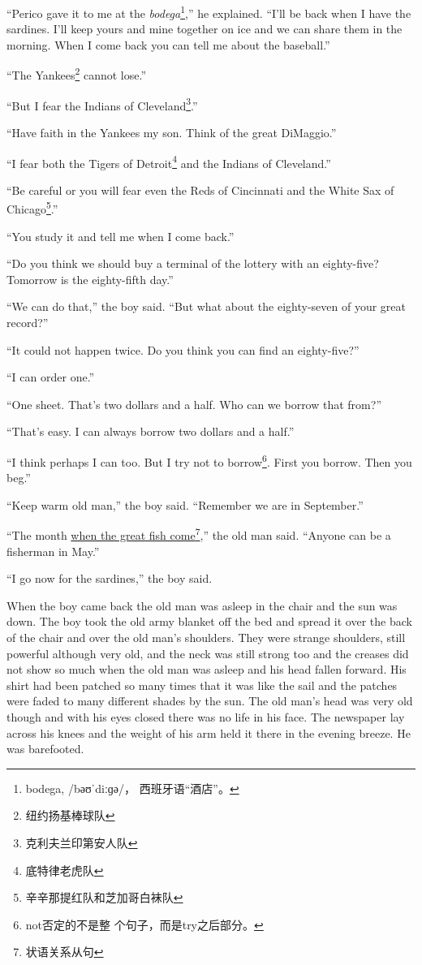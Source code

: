 \documentclass[fontset=ubuntu]{ctexrep}
\newcommand\doulos[1]{{\fontspec{Doulos SIL} /#1/}}
\begin{document}
``Perico gave it to me at the \emph{bodega}\footnote{bodega, \doulos{bәʊˈdiːɡә}，
  西班牙语“酒店”。},'' he explained. ``I'll be back when I have the
sardines. I'll keep yours and mine together on ice and we can share them in
the morning. When I come back you can tell me about the baseball.''

``The Yankees\footnote{纽约扬基棒球队} cannot lose.''

``But I fear the Indians of Cleveland\footnote{克利夫兰印第安人队}.''

``Have faith in the Yankees my son. Think of the great DiMaggio.''

``I fear both the Tigers of Detroit\footnote{底特律老虎队} and the Indians of Cleveland.''

``Be careful or you will fear even the Reds of Cincinnati and the White Sax of Chicago\footnote{辛辛那提红队和芝加哥白袜队}.''

``You study it and tell me when I come back.''

``Do you think we should buy a \gls{terminal} of the lottery with an eighty-five?
Tomorrow is the eighty-fifth day.''

``We can do that,'' the boy said. ``But what about the eighty-seven of your great record?''

``It could not happen twice. Do you think you can find an eighty-five?''

``I can \gls{order} one.''

``One sheet. That's two dollars and a half. Who can we borrow that from?''

``That's easy. I can always borrow two dollars and a half.''

``I think perhaps I can too. But I try not to borrow\footnote{not否定的不是整
  个句子，而是try之后部分。}. First you borrow. Then you beg.''

``Keep warm old man,'' the boy said. ``Remember we are in September.''

``The month \uline{when the great fish come}\footnote{状语关系从句},'' the old
man said. ``Anyone can be a fisherman in May.''

``I go now for the sardines,'' the boy said.

When the boy came back the old man was \gls{asleep} in the chair and the sun was
down. The boy took the old army \gls{blanket} off the bed and \gls{spread}
it over the back of the chair and over the old man's shoulders. They were
strange shoulders, still powerful although very old, and the neck was still
strong too and the \glspl{crease} did not show so much when the old man was
asleep and his head fallen forward. His shirt had been \gls{patched} so many
times that it was like the sail and the patches were \gls{faded} to many
different \glspl{shade} by the sun. The old man's head was very old though
and with his eyes closed there was no life in his face. The newspaper
\gls{lay} across his \glspl{knee} and the weight of his arm held it there in
the evening breeze. He was \gls{barefooted}.
\end{document}
